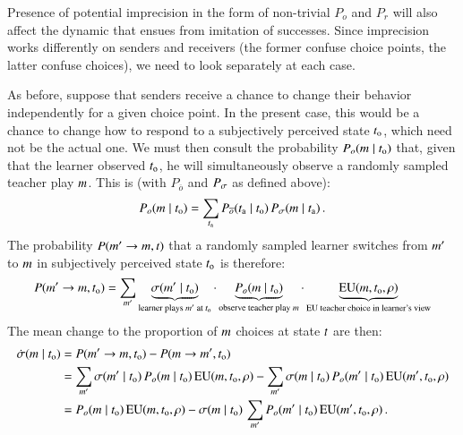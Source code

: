 \documentclass[fleqn,reqno,10pt]{article}
\begin{document}
Presence of potential imprecision in the form of non-trivial $P_o$ and $P_r$ will also affect
the dynamic that ensues from imitation of successes. Since imprecision works differently on
senders and receivers (the former confuse choice points, the latter confuse choices), we need
to look separately at each case.

As before, suppose that senders receive a chance to change their behavior independently for a
given choice point. In the present case, this would be a chance to change how to respond to a
subjectively perceived state $t_{\mathrm{o}}$, which need not be the actual one. We must then
consult the probability $P_o(m \mid t_{\mathrm{o}})$ that, given that the learner
observed $t_{\mathrm{o}}$, he will simultaneously observe a randomly sampled teacher play
$m$. This is (with $P_{\overline{o}}$ and $P_{\sigma}$ as defined above):
\begin{align*}
  P_o(m \mid t_{\mathrm{o}}) = \sum_{t_{\mathrm{a}}} P_{\overline{o}}(t_{\mathrm{a}}
  \mid t_{\mathrm{o}}) \thinspace P_{\sigma}(m \mid t_{\mathrm{a}})\,.
\end{align*}
The probability $P(m' \rightarrow m, t)$ that a randomly sampled learner switches
from $m'$ to $m$ in subjectively perceived state $t_{\mathrm{o}}$ is therefore:
\begin{align*}
  P(m' \rightarrow m, t_{\mathrm{o}}) = \sum_{m'} \underbrace{\sigma(m' \mid
    t_{\mathrm{o}})}_{\text{learner plays $m'$ at $t_{\mathrm{o}}$}} \cdot
  \underbrace{P_{o}(m \mid t_{\mathrm{o}})}_{\text{observe teacher play $m$}} \cdot
  \underbrace{\mathrm{EU}(m, t_{\mathrm{o}}, \rho)}_{\text{EU teacher choice in learner's view}}
\end{align*}
The mean change to the proportion of $m$ choices at state $t$ are then:
\begin{align}
  \label{eq:nRDSender}
  \dot{\sigma}(m \mid t_{\mathrm{o}}) & = P(m' \rightarrow m, t_{\mathrm{o}}) - P(m
  \rightarrow m', t_{\mathrm{o}}) \nonumber \\
  & = \sum_{m'} \sigma(m' \mid t_{\mathrm{o}}) \thinspace P_o(m \mid
  t_{\mathrm{o}}) \thinspace \mathrm{EU}(m, t_{\mathrm{o}}, \rho) - \sum_{m'} \sigma(m \mid t_{\mathrm{o}}) \thinspace
  P_o(m' \mid t_{\mathrm{o}}) \thinspace \mathrm{EU}(m', t_{\mathrm{o}}, \rho) \nonumber \\
  & = P_o(m \mid t_{\mathrm{o}}) \thinspace \mathrm{EU}(m, t_{\mathrm{o}}, \rho) - \sigma(m \mid t_{\mathrm{o}}) \thinspace \sum_{m'} P_o(m' \mid t_{\mathrm{o}}) \thinspace \mathrm{EU}(m', t_{\mathrm{o}}, \rho)\,.
\end{align}
\end{document}
